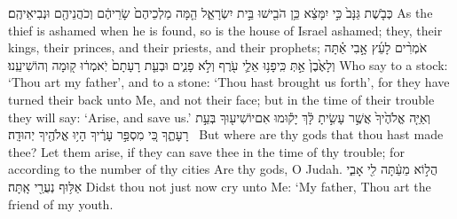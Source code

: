 {כְּבֹ֤שֶׁת גַּנָּב֙ כִּ֣י יִמָּצֵ֔א כֵּ֥ן הֹבִ֖ישׁוּ בֵּ֣ית יִשְׂרָאֵ֑ל הֵ֤מָּה מַלְכֵיהֶם֙ שָׂרֵיהֶ֔ם וְכֹהֲנֵיהֶ֖ם וּנְבִיאֵיהֶֽם׃}
{As the thief is ashamed when he is found, so is the house of Israel ashamed; they, their kings, their princes, and their priests, and their prophets;}
{אֹמְרִ֨ים לָעֵ֜ץ אָ֣בִי אַ֗תָּה וְלָאֶ֙בֶן֙ אַ֣תְּ  כִּֽי\maqqaf פָנ֥וּ אֵלַ֛י עֹ֖רֶף וְלֹ֣א פָנִ֑ים וּבְעֵ֤ת רָעָתָם֙ יֹֽאמְר֔וּ ק֖וּמָה וְהוֹשִׁיעֵֽנוּ׃}
{Who say to a stock: ‘Thou art my father’, and to a stone: ‘Thou hast brought us forth’, for they have turned their back unto Me, and not their face; but in the time of their trouble they will say: ‘Arise, and save us.’}
{וְאַיֵּ֤ה אֱלֹהֶ֙יךָ֙ אֲשֶׁ֣ר עָשִׂ֣יתָ לָּ֔ךְ יָק֕וּמוּ אִם\maqqaf יוֹשִׁיע֖וּךָ בְּעֵ֣ת רָעָתֶ֑ךָ כִּ֚י מִסְפַּ֣ר עָרֶ֔יךָ הָי֥וּ אֱלֹהֶ֖יךָ יְהוּדָֽה׃ \setuma }
{But where are thy gods that thou hast made thee? Let them arise, if they can save thee in the time of thy trouble; for according to the number of thy cities Are thy gods, O Judah.}
\setcounter{chap}{3}
\setcounter{verse}{4}
{הֲל֣וֹא מֵעַ֔תָּה  לִ֖י אָבִ֑י אַלּ֥וּף נְעֻרַ֖י אָֽתָּה׃}
{Didst thou not just now cry unto Me: ‘My father, Thou art the friend of my youth.}
